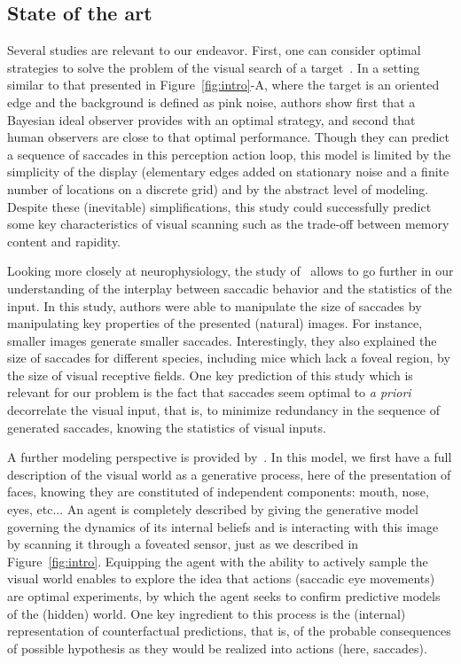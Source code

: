 \subsection{State of the art}
Several studies are relevant to our endeavor. First, one can consider optimal strategies to solve the problem of the visual search of a target~\citep{Najemnik05}. In a setting similar to that presented in Figure~\ref{fig:intro}-A, where the target is an oriented edge and the background is defined as pink noise, authors show first that a Bayesian ideal observer provides with an optimal strategy, and second that human observers are close to that optimal performance. Though they can predict a sequence of saccades in this perception action loop, this model is limited by the simplicity of the display (elementary edges added on stationary noise and a finite number of locations on a discrete grid) and by the abstract level of modeling. Despite these (inevitable) simplifications, this study could successfully predict some key characteristics of visual scanning such as the trade-off between memory content and rapidity.

Looking more closely at neurophysiology, the study of~\citep{Samonds18} allows to go further in our understanding of the interplay between saccadic behavior and the statistics of the input. In this study, authors were able to manipulate the size of saccades by manipulating key properties of the presented (natural) images. For instance, smaller images generate smaller saccades. Interestingly, they also explained the size of saccades for different species, including mice which lack a foveal region, by the size of visual receptive fields. One key prediction of this study which is relevant for our problem is the fact that saccades seem optimal to \emph{a priori} decorrelate the visual input, that is, to minimize redundancy in the sequence of generated saccades, knowing the statistics of visual inputs.

A further modeling perspective is provided by~\citep{Friston12}. In this model, we first have a full description of the visual world as a generative process, here of the presentation of faces, knowing they are constituted of independent components: mouth, nose, eyes, etc... An agent is completely described by giving the generative model governing the dynamics of its internal beliefs and is interacting with this image by scanning it through a foveated sensor, just as we described in Figure~\ref{fig:intro}. Equipping the agent with the ability to actively sample the visual world enables to explore the idea that actions (saccadic eye movements) are optimal experiments, by which the agent seeks to confirm predictive models of the (hidden) world. One key ingredient to this process is the (internal) representation of counterfactual predictions, that is, of the probable consequences of possible hypothesis as they would be realized into actions (here, saccades).

